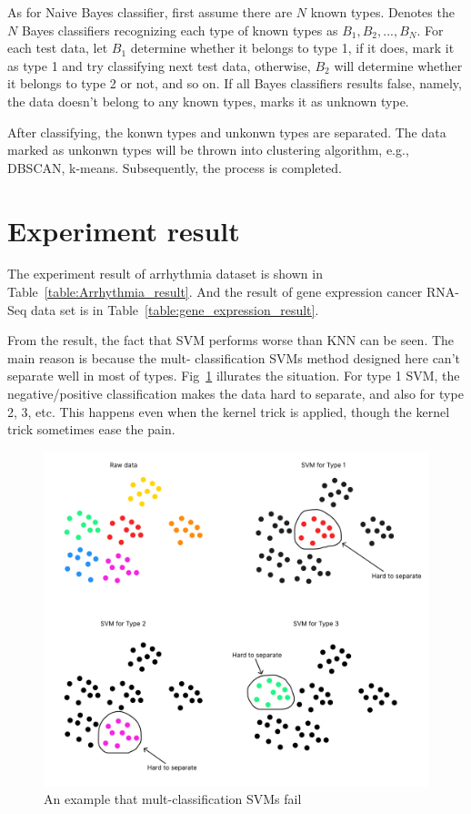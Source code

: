 \documentclass[twocolumn,10pt]{article}
\begin{document}
  As for Naive Bayes classifier, first assume there are $N$ known types. Denotes the $N$ Bayes classifiers recognizing each 
  type of known types as $B_1, B_2, ..., B_N$. For each test data, let $B_1$ determine whether it belongs to type 1, if 
  it does, mark it as type 1 and try classifying next test data, otherwise, $B_2$ will determine whether it belongs to type 2 
  or not, and so on. If all Bayes classifiers results false, namely, the data doesn't belong to any known types, marks it 
  as unknown type.
  
  After classifying, the konwn types and unkonwn types are separated. The data marked as unkonwn types will be thrown 
  into clustering algorithm, e.g., DBSCAN, k-means. Subsequently, the process is completed.

\section{Experiment result}
  The experiment result of arrhythmia dataset is shown in Table~\ref{table:Arrhythmia_result}. And the result of gene 
  expression cancer RNA-Seq data set is in Table~\ref{table:gene_expression_result}. 

  From the result, the fact that SVM performs worse than KNN can be seen. The main reason is because the mult- 
  classification SVMs method designed here can't separate well in most of types. Fig~\ref{fig:SVM_fail} illurates the 
  situation. For type 1 SVM, the negative/positive classification makes the data hard to separate, and also for type 
  2, 3, etc. This happens even when the kernel trick is applied, though the kernel trick sometimes ease the pain. 
  \begin{figure}[htb]
    \centering
    \includegraphics[scale=0.15]{assets/SVM_fail.pdf}
    \caption{An example that mult-classification SVMs fail}
    \label{fig:SVM_fail}
  \end{figure}
\end{document}
